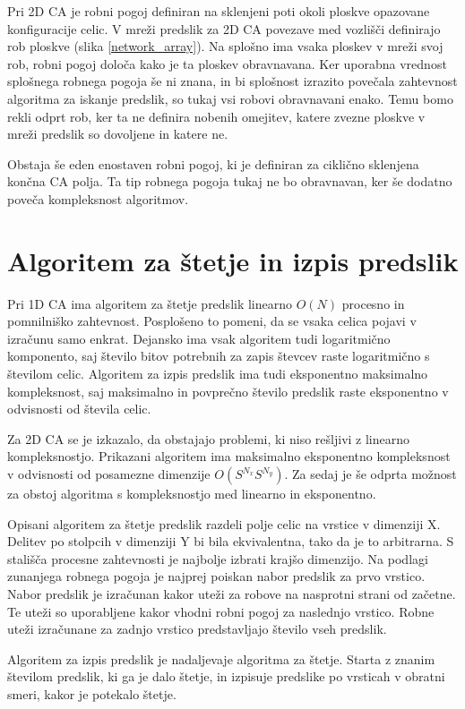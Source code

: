 \documentclass[12pt,a4paper,openany,twoside]{book}
\begin{document}
Pri 2D CA je robni pogoj definiran na sklenjeni poti okoli ploskve opazovane konfiguracije celic.
V mreži predslik za 2D CA povezave med vozlišči definirajo rob ploskve (slika \ref{network_array}).
Na splošno ima vsaka ploskev v mreži svoj rob, robni pogoj določa kako je ta ploskev obravnavana.
Ker uporabna vrednost splošnega robnega pogoja še ni znana,
in bi splošnost izrazito povečala zahtevnost algoritma za iskanje predslik,
so tukaj vsi robovi obravnavani enako. Temu bomo rekli odprt rob,
ker ta ne definira nobenih omejitev, katere zvezne ploskve v mreži predslik
so dovoljene in katere ne.

Obstaja še eden enostaven robni pogoj, ki je definiran za ciklično sklenjena končna CA polja.
Ta tip robnega pogoja tukaj ne bo obravnavan, ker še dodatno poveča kompleksnost algoritmov.

\chapter{Algoritem za štetje in izpis predslik}

Pri 1D CA ima algoritem za štetje predslik linearno \(O(N)\) procesno in pomnilniško zahtevnost.
Posplošeno to pomeni, da se vsaka celica pojavi v izračunu samo enkrat.
Dejansko ima vsak algoritem tudi logaritmično komponento,
saj število bitov potrebnih za zapis števcev raste logaritmično s številom celic.
Algoritem za izpis predslik ima tudi eksponentno maksimalno kompleksnost,
saj maksimalno in povprečno število predslik raste eksponentno
v odvisnosti od števila celic.

Za 2D CA se je izkazalo, da obstajajo problemi, ki niso rešljivi z linearno kompleksnostjo.
Prikazani algoritem ima maksimalno eksponentno kompleksnost
v odvisnosti od posamezne dimenzije \(O(S^{N_x} S^{N_y})\).
Za sedaj je še odprta možnost za obstoj algoritma s kompleksnostjo
med linearno in eksponentno.

Opisani algoritem za štetje predslik razdeli polje celic na vrstice v dimenziji X.
Delitev po stolpcih v dimenziji Y bi bila ekvivalentna,
tako da je to arbitrarna. S stališča procesne zahtevnosti je najbolje izbrati krajšo dimenzijo.
Na podlagi zunanjega robnega pogoja je najprej poiskan nabor predslik za prvo vrstico.
Nabor predslik je izračunan kakor uteži za robove na nasprotni strani od začetne.
Te uteži so uporabljene kakor vhodni robni pogoj za naslednjo vrstico.
Robne uteži izračunane za zadnjo vrstico predstavljajo število vseh predslik.

Algoritem za izpis predslik je nadaljevaje algoritma za štetje.
Starta z znanim številom predslik, ki ga je dalo štetje, in izpisuje predslike
po vrsticah v obratni smeri, kakor je potekalo štetje.
\end{document}
